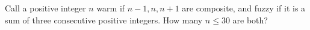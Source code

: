 Call a positive integer $n$ warm if $n-1,n,n+1$ are composite, and fuzzy if it is a sum of three consecutive positive integers. How many $n\le30$ are both?
